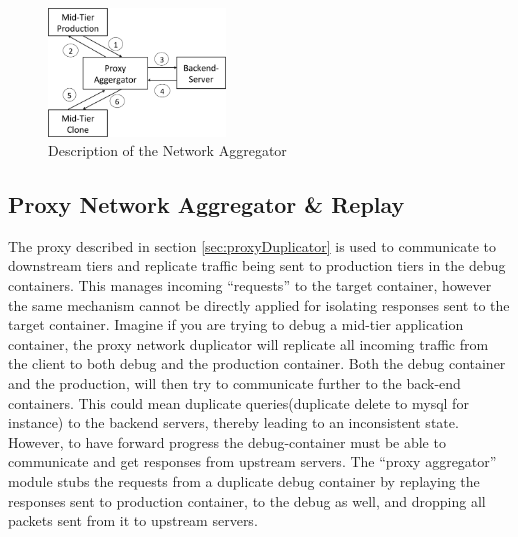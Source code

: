 \begin{figure}[t]
  \begin{center}
    \includegraphics[width=0.42\textwidth]{figs/aggregator.png}
    \caption{Description of the Network Aggregator}
    \label{fig:aggregator}
  \end{center}
\end{figure}

\subsection{Proxy Network Aggregator \& Replay }
\label{sec:proxyAggregator}
\noindent
The proxy described in section \ref{sec:proxyDuplicator} is used to communicate to downstream tiers and replicate traffic being sent to production tiers in the debug containers.
This manages incoming ``requests'' to the target container, however the same mechanism cannot be directly applied for isolating responses sent to the target container. 
Imagine if you are trying to debug a mid-tier application container, the proxy network duplicator will replicate all incoming traffic from the client to both debug and the production container. 
Both the debug container and the production, will then try to communicate further to the back-end containers.
This could mean duplicate queries(duplicate delete to mysql for instance) to the backend servers, thereby leading to an inconsistent state.
However, to have forward progress the debug-container must be able to communicate and get responses from upstream servers.
The ``proxy aggregator'' module stubs the requests from a duplicate debug container by replaying the responses sent to production container, to the debug as well, and dropping all packets sent from it to upstream servers.

